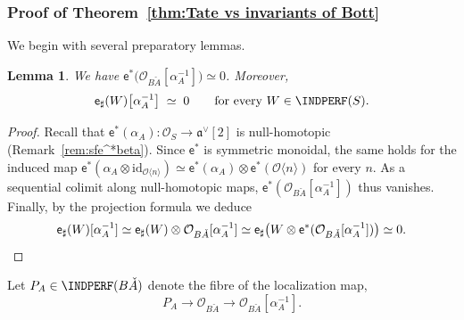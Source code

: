 \documentclass[12pt, oneside]{amsart}
\numberwithin{equation}{section}
\newtheorem{lemma}[subsubsection]{Lemma}
\theoremstyle{remark}
\theoremstyle{plain}
\newcommand{\frav}{\mathfrak{a}^\vee}
\newcommand{\OO}{\mathcal{O}}
\newcommand{\id}{\mathrm{id}}
\newcommand{\Thom}[1]{\langle #1 \rangle}
\newcommand{\sfe}{\mathsf{e}}
\begin{document}
\subsubsection{Proof of Theorem~\ref{thm:Tate vs invariants of Bott}}

We begin with several preparatory lemmas.

\begin{lemma}\label{lem:induced beta null}
  We have $\sfe^*\bigl( \OO_{B\check{A}}[\alpha_A^{-1}] \bigr) \simeq 0$.
  Moreover,
  \[
    \sfe_\sharp(W)\bigl[\alpha_A^{-1}\bigr] \;\simeq\; 0
    \qquad \text{for every } W \in \INDPERF(S).
  \]
\end{lemma}
\begin{proof}
  Recall that $\sfe^*(\alpha_A) : \OO_S \to \frav[2]$ is null-homotopic (Remark~\ref{rem:sfe^*beta}).
  Since $\sfe^*$ is symmetric monoidal, the same holds for the induced map $\sfe^*(\alpha_A \otimes \id_{\OO\Thom{n}}) \simeq \sfe^*(\alpha_A) \otimes \sfe^*(\OO\Thom{n})$ for every $n$.
  As a sequential colimit along null-homotopic maps, $\sfe^*(\OO_{B\check{A}}[\alpha_A^{-1}])$ thus vanishes.
  Finally, by the projection formula we deduce
  \[
    \sfe_\sharp(W)[\alpha_A^{-1}]
    \simeq \sfe_\sharp(W) \otimes \OO_{B\check{A}}[\alpha_A^{-1}]
    \simeq \sfe_\sharp\bigl( W \otimes \sfe^*(\OO_{B\check{A}}[\alpha_A^{-1}]) \bigr)
    \simeq 0. \qedhere
  \]
\end{proof}

Let $P_A \in \INDPERF(B\check{A})$ denote the fibre of the localization map,
\begin{equation}\label{eq:isotropy triangle}
  P_A \longrightarrow \OO_{B\check{A}} \longrightarrow \OO_{B\check{A}}[\alpha_A^{-1}].
\end{equation}
\end{document}
